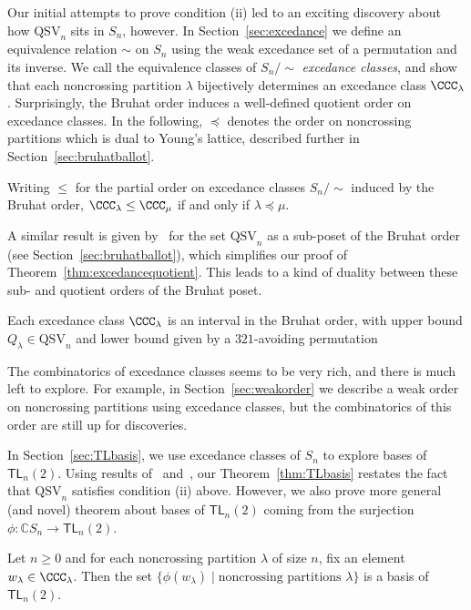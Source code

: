 \documentclass[12pt]{amsart}
\theoremstyle{definition}
\theoremstyle{remark}
\numberwithin{equation}{section}
\newenvironment{introthm}[1]{
  \renewcommand\theequation{#1}
  \thm
}{\endthm}
\newenvironment{introcor}[1]{
  \renewcommand\theequation{#1}
  \cor
}{\endcor}
\newcommand{\CC}{\mathbb{C}}
\newcommand{\TL}{\mathsf{TL}}
\newcommand{\QSV}{\mathrm{QSV}}
\begin{document}
Our initial attempts to prove condition (ii) led to an exciting discovery about how $\QSV_{n}$ sits in $S_{n}$, however.  
In Section~\ref{sec:excedance} we define an equivalence relation $\sim$ on $S_{n}$ using the weak excedance set of a permutation and its inverse.  
We call the equivalence classes of $S_{n}\big/\!\!\sim$ \emph{excedance classes}, and show that each noncrossing partition $\lambda$ bijectively determines an excedance class $\CCC_{\lambda}$.  
Surprisingly, the Bruhat order induces a well-defined quotient order on excedance classes.  
In the following, $\preceq$ denotes the order on noncrossing partitions which is dual to Young's lattice, described further in Section~\ref{sec:bruhatballot}.

\begin{introthm}{\ref{thm:excedancequotient}}
Writing $\le$ for the partial order on excedance classes $S_{n}\big/\!\! \sim$ induced by the Bruhat order, $\CCC_{\lambda} \le \CCC_{\mu}$ if and only if $\lambda \preceq \mu$.
\end{introthm}

A similar result is given by~\cite{GobetWilliams} for the set $\QSV_{n}$ as a sub-poset of the Bruhat order (see Section~\ref{sec:bruhatballot}), which simplifies our proof of Theorem~\ref{thm:excedancequotient}.  This leads to a kind of duality between these sub- and quotient orders of the Bruhat poset.

\begin{introcor}{\ref{cor:interval}}
Each excedance class $\CCC_{\lambda}$ is an interval in the Bruhat order, with upper bound $Q_{\lambda}\in \QSV_n$ and lower bound given by a $321$-avoiding permutation
\end{introcor}

The combinatorics of excedance classes seems to be very rich, and there is much left to explore.   
For example, in Section~\ref{sec:weakorder} we describe a weak order on noncrossing partitions using excedance classes, but the combinatorics of this order are still up for discoveries.  

In Section~\ref{sec:TLbasis}, we use excedance classes of $S_{n}$ to explore bases of $\TL_{n}(2)$.  Using results of~\cite{GobetWilliams} and~\cite{Zinno}, our Theorem~\ref{thm:TLbasis} restates the fact that $\QSV_{n}$ satisfies condition (ii) above.  However, we also prove more general (and novel) theorem about bases of $\TL_{n}(2)$ coming from the surjection $\phi: \CC S_{n} \to \TL_{n}(2)$.

\begin{introthm}{\ref{thm:TLbases}}
Let $n \ge 0$ and for each noncrossing partition $\lambda$ of size $n$, fix an element $w_{\lambda} \in \CCC_{\lambda}$. Then the set $\{\phi(w_{\lambda}) \;|\; \text{noncrossing partitions $\lambda$}\}$ is a basis of $\TL_{n}(2)$.
\end{introthm}
\end{document}
